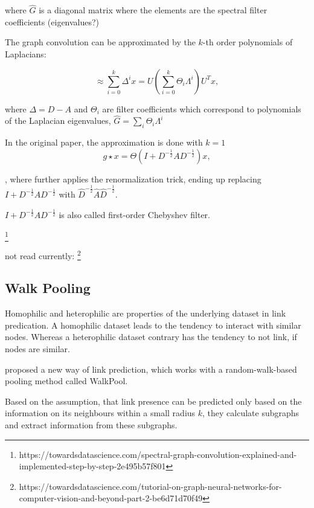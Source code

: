where $\hat{G}$ is a diagonal matrix where the elements are the 
spectral filter coefficients (eigenvalues?)

The graph convolution can be approximated by the $k$-th order polynomials of Laplacians:

\begin{equation}
    \approx \sum_{i=0}^{k} \Delta^i x = U \left ( \sum_{i=0}^{k}  \Theta_i \Lambda^i \right ) U^T x,
\end{equation}

where $\Delta = D - A$ and $\Theta_i$ are 
filter coefficients which correspond to polynomials of the Laplacian eigenvalues,
 $\hat{G} = \sum_i \Theta_i \Lambda^i$


 In the original \cite{GCN} paper, the approximation is done with $k = 1$ 
 \begin{equation}
     g \star x = \Theta (I + D^{-\frac{1}{2}} A D^{-\frac{1}{2}} )x,
 \end{equation}

, where \citet{GCN} further applies the renormalization trick, ending up replacing
$I + D^{-\frac{1}{2}} A D^{-\frac{1}{2}}$ with $\hat{D}^{-\frac{1}{2}} \hat{A} \hat{D}^{-\frac{1}{2}}$.

$I + D^{-\frac{1}{2}} A D^{-\frac{1}{2}}$ is also called first-order Chebyshev filter.

\footnote{https://towardsdatascience.com/spectral-graph-convolution-explained-and-implemented-step-by-step-2e495b57f801}

not read currently:
\footnote{https://towardsdatascience.com/tutorial-on-graph-neural-networks-for-computer-vision-and-beyond-part-2-be6d71d70f49}



\subsection{Walk Pooling}

Homophilic and heterophilic are properties of the underlying dataset in link predication. 
A homophilic dataset leads to the tendency to interact with similar nodes. Whereas a heterophilic dataset contrary has the tendency to 
not link, if nodes are similar.

\citet{walkPooling} proposed a new way of link prediction, which works
with a random-walk-based pooling method called WalkPool.

Based on the assumption, that link presence can be predicted 
only based on the information on its neighbours within a small radius $k$,
they calculate subgraphs and extract information from these subgraphs.

